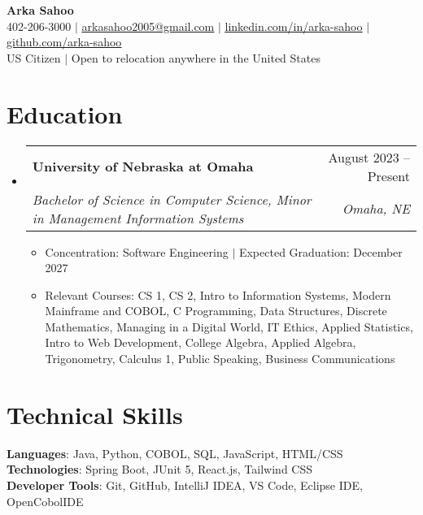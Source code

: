 \documentclass[letterpaper,11pt]{article}
\makeatletter
\newcommand{\resumeItem}[1]{
  \item\small{
    {#1 \vspace{-2pt}}
  }
}
\newcommand{\resumeSubheading}[4]{
  \vspace{-2pt}\item
    \begin{tabular*}{0.97\textwidth}[t]{l@{\extracolsep{\fill}}r}
      \textbf{#1} & #2 \\
      \textit{\small#3} & \textit{\small #4} \\
    \end{tabular*}\vspace{-7pt}
}
\newcommand{\resumeSubHeadingListStart}{\begin{itemize}[leftmargin=0.15in, label={}]}
\newcommand{\resumeSubHeadingListEnd}{\end{itemize}}
\newcommand{\resumeItemListStart}{\begin{itemize}}
\newcommand{\resumeItemListEnd}{\end{itemize}\vspace{-5pt}}
\makeatother
\begin{document}

\begin{center}
    \textbf{\Huge Arka Sahoo} \\ \vspace{1pt}
    \small 402-206-3000
    $|$
    \href{mailto:arkasahoo2005@gmail.com}{\underline{arkasahoo2005@gmail.com}}
    $|$
    \href{https://linkedin.com/in/arka-sahoo}{\underline{linkedin.com/in/arka-sahoo}} $|$
    \href{https://github.com/arka-sahoo}{\underline{github.com/arka-sahoo}} \vspace{1pt} \\
    US Citizen $|$ Open to relocation anywhere in the United States
\end{center}


\section{Education}
  \resumeSubHeadingListStart
    \resumeSubheading
      {University of Nebraska at Omaha}{August 2023 -- Present}
      {Bachelor of Science in Computer Science, Minor in Management Information Systems}{Omaha, NE}
    \resumeItemListStart
        \resumeItem{Concentration: Software Engineering $|$ Expected Graduation: December 2027}
        \resumeItem{Relevant Courses: CS 1, CS 2, Intro to Information Systems, Modern Mainframe and COBOL, C Programming, Data Structures, Discrete Mathematics, Managing in a Digital World, IT Ethics, Applied Statistics, Intro to Web Development, College Algebra, Applied Algebra, Trigonometry, Calculus 1, Public Speaking, Business Communications}
    \resumeItemListEnd
  \resumeSubHeadingListEnd

\section{Technical Skills}
\begin{itemize}[leftmargin=0.15in, label={}]
  \small{\item{
   \textbf{Languages}{: Java, Python, COBOL, SQL, JavaScript, HTML/CSS} \\  
   \textbf{Technologies}{: Spring Boot, JUnit 5, React.js, Tailwind CSS} \\  
   \textbf{Developer Tools}{: Git, GitHub, IntelliJ IDEA, VS Code, Eclipse IDE, OpenCobolIDE} \\
  }}
\end{itemize}
\end{document}
